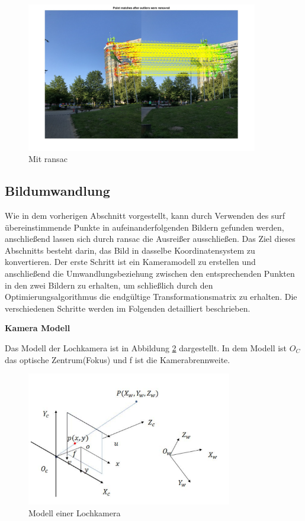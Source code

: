\begin{figure}[H]
 \centering 
 \includegraphics[keepaspectratio,width=0.9\textwidth]{images/3_Ersteverfahren/RANSAC/MitRANSAC.pdf}
 \caption{Mit \gls{ransac}}
 \label{fig:MitRANSAC}
\end{figure} 


\subsection{Bildumwandlung}

Wie in dem vorherigen Abschnitt vorgestellt, kann durch Verwenden des \gls{surf} übereinstimmende Punkte in aufeinanderfolgenden Bildern gefunden werden, anschließend lassen sich durch \gls{ransac} die Ausreißer ausschließen. Das Ziel dieses Abschnitts besteht darin, das Bild in dasselbe Koordinatensystem zu konvertieren. Der erste Schritt ist ein Kameramodell zu erstellen und anschließend die Umwandlungsbeziehung zwischen den entsprechenden Punkten in den zwei Bildern zu erhalten, um schließlich durch den Optimierungsalgorithmus die endgültige Transformationsmatrix zu erhalten. Die verschiedenen Schritte werden im Folgenden detailliert beschrieben.

\textbf{Kamera Modell}

Das Modell der Lochkamera ist in Abbildung \ref{fig:cameramodel} dargestellt. In dem Modell ist $O_C$ das optische Zentrum(Fokus) und f ist die Kamerabrennweite.

\begin{figure}[htb]
 \centering 
 \includegraphics[keepaspectratio,width=0.8\textwidth]{images/3_Ersteverfahren/Kamera/cameramodel.pdf}
 \caption{Modell einer Lochkamera}
 \label{fig:cameramodel}
\end{figure} 

